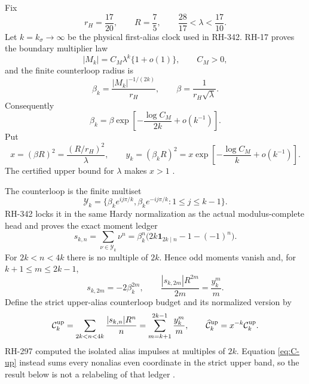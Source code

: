 \documentclass[11pt]{article}
\theoremstyle{remark}
\newcommand{\cY}{\mathcal Y}
\newcommand{\one}{\mathbf 1}
\begin{document}
Fix
\begin{equation}\label{eq:constants}
 r_H=\frac{17}{20},\qquad R=\frac75,
 \qquad \frac{28}{17}<\lambda<\frac{17}{10}.
\end{equation}
Let $k=k_\sigma\to\infty$ be the physical first-alias clock used in
RH-342.  RH-17 proves the boundary multiplier law
\begin{equation}\label{eq:multiplier}
 |M_k|=C_M\lambda^k\{1+o(1)\},\qquad C_M>0,
\end{equation}
and the finite counterloop radius is
\begin{equation}\label{eq:beta-k}
 \beta_k=\frac{|M_k|^{-1/(2k)}}{r_H},\qquad
 \beta=\frac1{r_H\sqrt\lambda}.
\end{equation}
Consequently
\begin{equation}\label{eq:beta-asymptotic}
 \beta_k
 =\beta\exp\left[-\frac{\log C_M}{2k}+o(k^{-1})\right].
\end{equation}
Put
\begin{equation}\label{eq:x-y}
 x=(\beta R)^2=\frac{(R/r_H)^2}{\lambda},\qquad
 y_k=(\beta_kR)^2
 =x\exp\left[-\frac{\log C_M}{k}+o(k^{-1})\right].
\end{equation}
The certified upper bound for $\lambda$ makes $x>1$
\citep{WangProjectorMass2026,WangTimeOrdered2026}.

The counterloop is the finite multiset
\begin{equation}\label{eq:Y}
 \cY_k=\{\beta_ke^{ij\pi/k},\beta_ke^{-ij\pi/k}:1\le j\le k-1\}.
\end{equation}
RH-342 locks it in the same Hardy normalization as the actual
modulus-complete head and proves the exact moment ledger
\citep{WangHeadCounterloop2026}
\begin{equation}\label{eq:s-ledger}
 s_{k,n}=\sum_{\nu\in\cY_k}\nu^n
 =\beta_k^n\bigl(2k\one_{2k\mid n}-1-(-1)^n\bigr).
\end{equation}
For $2k<n<4k$ there is no multiple of $2k$.  Hence odd moments vanish and,
for $k+1\le m\le2k-1$,
\begin{equation}\label{eq:upper-even}
 s_{k,2m}=-2\beta_k^{2m},\qquad
 \frac{|s_{k,2m}|R^{2m}}{2m}=\frac{y_k^m}{m}.
\end{equation}
Define the strict upper-alias counterloop budget and its normalized version by
\begin{equation}\label{eq:C-up}
 \mathcal C_k^{\rm up}
 =\sum_{2k<n<4k}\frac{|s_{k,n}|R^n}{n}
 =\sum_{m=k+1}^{2k-1}\frac{y_k^m}{m},
 \qquad
 \widehat{\mathcal C}_k^{\rm up}=x^{-k}\mathcal C_k^{\rm up}.
\end{equation}
RH-297 computed the isolated alias impulses at multiples of $2k$.
Equation \eqref{eq:C-up} instead sums every nonalias even coordinate in the
strict upper band, so the result below is not a relabeling of that ledger
\citep{WangAliasLedger2026}.
\end{document}
